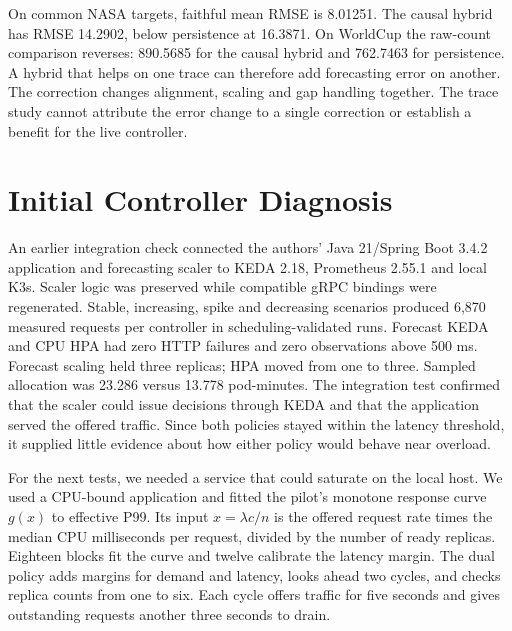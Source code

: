 \documentclass[10pt,twocolumn,a4paper]{article}
\begin{document}
\begin{table}[t]\centering\small\setlength{\tabcolsep}{3pt}
\caption{Forecast RMSE. Faithful means use full released tests; causal NASA excludes 29 gap targets. WorldCup is displayed on the common author scale after causal fitting.}\label{tab:baseline}
\ifdim\wd\databox>\columnwidth\relax\resizebox{\columnwidth}{!}{\usebox{\databox}}\else\usebox{\databox}\fi
\end{table}


On common NASA targets, faithful mean RMSE is 8.01251. The causal hybrid has RMSE 14.2902, below persistence at 16.3871. On WorldCup the raw-count comparison reverses: 890.5685 for the causal hybrid and 762.7463 for persistence. A hybrid that helps on one trace can therefore add forecasting error on another. The correction changes alignment, scaling and gap handling together. The trace study cannot attribute the error change to a single correction or establish a benefit for the live controller.

\section{Initial Controller Diagnosis}
An earlier integration check connected the authors' Java 21/Spring Boot 3.4.2 application and forecasting scaler to KEDA 2.18, Prometheus 2.55.1 and local K3s. Scaler logic was preserved while compatible gRPC bindings were regenerated. Stable, increasing, spike and decreasing scenarios produced 6,870 measured requests per controller in scheduling-validated runs. Forecast KEDA and CPU HPA had zero HTTP failures and zero observations above 500 ms. Forecast scaling held three replicas; HPA moved from one to three. Sampled allocation was 23.286 versus 13.778 pod-minutes. The integration test confirmed that the scaler could issue decisions through KEDA and that the application served the offered traffic. Since both policies stayed within the latency threshold, it supplied little evidence about how either policy would behave near overload.

For the next tests, we needed a service that could saturate on the local host. We used a CPU-bound application and fitted the pilot's monotone response curve $g(x)$ to effective P99. Its input $x=\lambda c/n$ is the offered request rate times the median CPU milliseconds per request, divided by the number of ready replicas. Eighteen blocks fit the curve and twelve calibrate the latency margin. The dual policy adds margins for demand and latency, looks ahead two cycles, and checks replica counts from one to six. Each cycle offers traffic for five seconds and gives outstanding requests another three seconds to drain.
\end{document}
